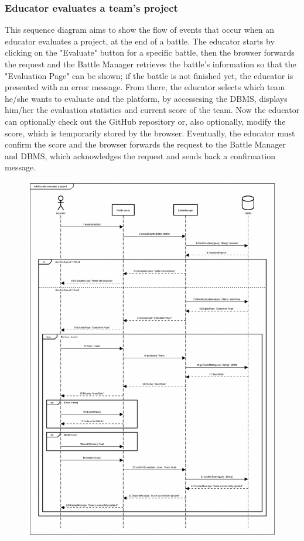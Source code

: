 \documentclass[12pt,oneside,a4paper]{article}
\begin{document}
\subsubsection{Educator evaluates a team's project}
This sequence diagram aims to show the flow of events that occur when an educator evaluates a project, at the end of a battle. The educator starts by clicking on the "Evaluate" button for a specific battle, then the browser forwards the request and the Battle Manager retrieves the battle's information so that the "Evaluation Page" can be shown; if the battle is not finished yet, the educator is presented with an error message. From there, the educator selects which team he/she wants to evaluate and the platform, by accessesing the DBMS, displays him/her the evaluation statistics and current score of the team. Now the educator can optionally check out the GitHub repository or, also optionally, modify the score, which is temporarily stored by the browser. Eventually, the educator must confirm the score and the browser forwards the request to the Battle Manager and DBMS, which acknowledges the request and sends back a confirmation message.
\begin{figure}[htbp]
    \centering
    \includegraphics[width=1\linewidth]{Images/Sequence Diagrams/Evaluate.png}
    \label{fig:enter-label}
\end{figure}
\end{document}
